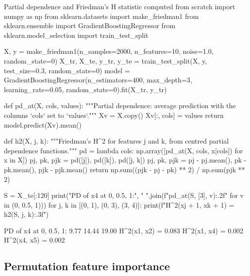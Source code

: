 \begin{pylisting}[label={lst:pdph}]{Partial dependence and Friedman's H statistic computed from scratch}
import numpy as np
from sklearn.datasets import make_friedman1
from sklearn.ensemble import GradientBoostingRegressor
from sklearn.model_selection import train_test_split

X, y = make_friedman1(n_samples=2000, n_features=10, noise=1.0, random_state=0)
X_tr, X_te, y_tr, y_te = train_test_split(X, y, test_size=0.3, random_state=0)
model = GradientBoostingRegressor(n_estimators=400, max_depth=3, learning_rate=0.05,
                                  random_state=0).fit(X_tr, y_tr)

def pd_at(X, cols, values):
    """Partial dependence: average prediction with the columns `cols` set to `values`."""
    Xv = X.copy()
    Xv[:, cols] = values
    return model.predict(Xv).mean()

def h2(X, j, k):
    """Friedman's H^2 for features j and k, from centred partial dependence functions."""
    pd = lambda cols: np.array([pd_at(X, cols, x[cols]) for x in X])
    pj, pk, pjk = pd([j]), pd([k]), pd([j, k])
    pj, pk, pjk = pj - pj.mean(), pk - pk.mean(), pjk - pjk.mean()
    return np.sum((pjk - pj - pk) ** 2) / np.sum(pjk ** 2)

S = X_te[:120]
print("PD of x4 at 0, 0.5, 1:", " ".join(f"{pd_at(S, [3], v):.2f}" for v in (0, 0.5, 1)))
for j, k in [(0, 1), (0, 3), (3, 4)]:
    print(f"H^2(x{j + 1}, x{k + 1}) = {h2(S, j, k):.3f}")
\end{pylisting}
\begin{pyoutput}
PD of x4 at 0, 0.5, 1: 9.77 14.44 19.00
H^2(x1, x2) = 0.083
H^2(x1, x4) = 0.002
H^2(x4, x5) = 0.002
\end{pyoutput}

\subsection{Permutation feature importance}

